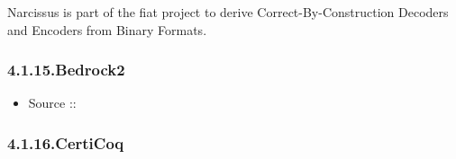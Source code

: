 \documentclass[12pt,twoside]{article}
\begin{document}
\noindent{}Narcissus is part of the fiat project to derive
Correct-By-Construction Decoders and Encoders from Binary Formats.%

\subsubsection{4.1.15.\hspace*{0.5em}Bedrock2}\label{sec-bedrock2}%

\begin{itemize}[noitemsep,topsep=\mdcompacttopsep]%

\item{}Source ::%
\end{itemize}%

\subsubsection{4.1.16.\hspace*{0.5em}CertiCoq}\label{sec-certicoq}%
\end{document}
